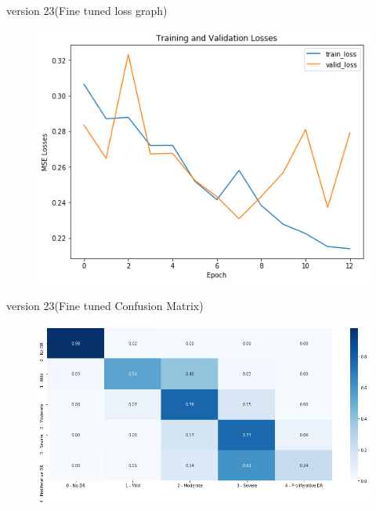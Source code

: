 \documentclass[10pt]{beamer}
\begin{document}
			\begin{frame}{version 23(Fine tuned loss graph)}
				\begin{figure}
					\includegraphics[scale=.5]{Results/vI23lossgraph.png}
				\end{figure}
			\end{frame}
			\begin{frame}{version 23(Fine tuned Confusion Matrix)}
				\begin{figure}
					\includegraphics[width=\linewidth]{Results/VI23confusion.png}
				\end{figure}
			\end{frame}
\end{document}
